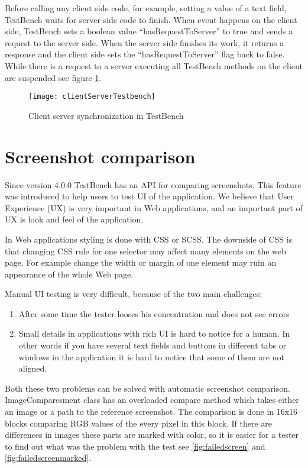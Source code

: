 Before calling any client side code, for example, setting a value of a
text field, TestBench waits for server side code to finish. When event happens
on the client side, TestBench sets a boolean value ``hasRequestToServer'' to
true and sends a request to the server side. When the server side finishes its
work, it returns a response and the client side sets the ``hasRequestToServer''
flag back to false. While there is a request to a server executing all TestBench
methods on the client are suspended see figure \ref{fig:clientServerTestbench}.  
	\begin{figure}
	\centering
	\texttt{[image: clientServerTestbench]}
	\caption{Client server synchronization in TestBench}
	\label{fig:clientServerTestbench}
	\end{figure}

\section{Screenshot comparison}
\label{sec:screencompare}
Since version 4.0.0 TestBench has an API for comparing screenshots. This 
feature was introduced to help users to test UI of the application. We believe
that User Experience (UX) is very important in Web applications, and an
important part of UX is look and feel of the application.

In Web applications styling is done with CSS or SCSS. The downside of CSS 
is that changing CSS rule for one selector may affect many elements on the
web page. For example change the width or margin of one element may ruin an
appearance of the whole Web page.

Manual UI testing is very difficult, because of the two main challenges:
\begin{enumerate}
  \item After some time the tester looses his concentration and does not see
  errors
  \item Small details in applications with rich UI is hard to notice for a
  human. In other words if you have several text fields and buttons in different
  tabs or windows in the application it is hard to notice that some of them are
  not aligned.
\end{enumerate}

Both these two problems can be solved with automatic screenshot comparison.
ImageComparesment class has an overloaded compare method which takes either an
image or a path to the reference screenshot. The comparison is done in 16x16
blocks comparing RGB values of the every pixel in this block. If there are
differences in images these parts are marked with color, so it is easier for a
tester to find out what was the problem with the test see
\ref{fig:failedscreen} and \ref{fig:failedscreenmarked}.

